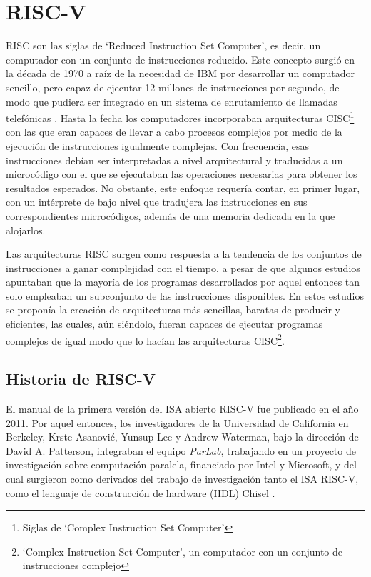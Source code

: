 \chapter{RISC-V}

RISC son las siglas de `Reduced Instruction Set Computer', es decir, un computador con un conjunto de instrucciones reducido. Este concepto surgió en la década de 1970 a raíz de la necesidad de IBM por desarrollar un computador sencillo, pero capaz de ejecutar 12 millones de instrucciones por segundo, de modo que pudiera ser integrado en un sistema de enrutamiento de llamadas telefónicas \cite{cocke1990evolution}.
Hasta la fecha los computadores incorporaban arquitecturas CISC\footnote{Siglas de `Complex Instruction Set Computer'} con las que eran capaces de llevar a cabo procesos complejos por medio de la ejecución de instrucciones igualmente complejas. Con frecuencia, esas instrucciones debían ser interpretadas a nivel arquitectural y traducidas a un microcódigo con el que se ejecutaban las operaciones necesarias para obtener los resultados esperados. No obstante, este enfoque requería  contar, en primer lugar, con un intérprete de bajo nivel que tradujera las instrucciones en sus correspondientes microcódigos, además de una memoria dedicada en la que alojarlos.

Las arquitecturas RISC surgen como respuesta a la tendencia de los conjuntos de instrucciones a ganar complejidad con el tiempo, a pesar de que algunos estudios \cite{tanenbaum1978implications} apuntaban que la mayoría de los programas desarrollados por aquel entonces tan solo empleaban un subconjunto de las instrucciones disponibles. En estos estudios se proponía la creación de arquitecturas más sencillas, baratas de producir y eficientes, las cuales, aún siéndolo, fueran capaces de ejecutar programas complejos de igual modo que lo hacían las arquitecturas CISC\footnote{`Complex Instruction Set Computer', un computador con un conjunto de instrucciones complejo}.

\section{Historia de RISC-V}

El manual de la primera versión del ISA abierto RISC-V fue publicado en el año 2011. Por aquel entonces, los investigadores de la Universidad de California en Berkeley, Krste Asanović, Yunsup Lee y Andrew Waterman, bajo la dirección de David A. Patterson, integraban el equipo \textit{ParLab}, trabajando en un proyecto de investigación sobre computación paralela, financiado por Intel y Microsoft, y del cual surgieron como derivados del trabajo de investigación tanto el ISA RISC-V, como el lenguaje de construcción de hardware (HDL) Chisel \cite{riscvhistory}.

